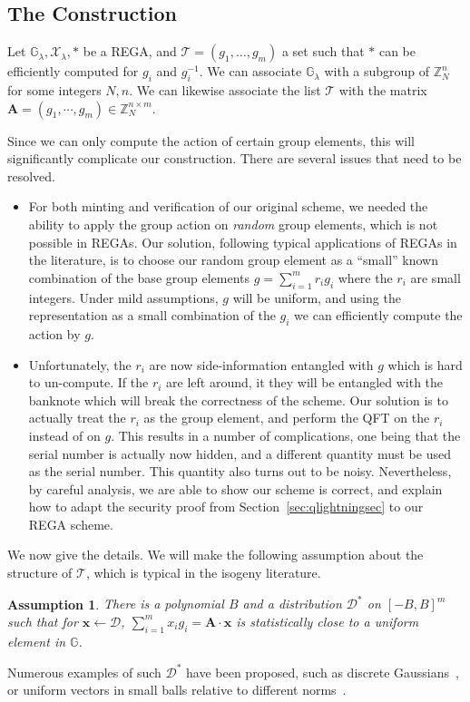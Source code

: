 \documentclass{article}\usepackage[a4paper,margin=20mm]{geometry}
\newtheorem{assumption}[theorem]{Assumption}
\numberwithin{theorem}{section}
\numberwithin{equation}{section}
\newcommand{\Z}{\mathbb{Z}}
\newcommand{\G}{\mathbb{G}}
\newcommand{\xv}{{\mathbf{x}}}
\newcommand{\Am}{{\mathbf{A}}}
\newcommand{\Ds}{{\mathcal{D}}}
\newcommand{\Ts}{{\mathcal{T}}}
\newcommand{\Xs}{{\mathcal{X}}}
\begin{document}
\subsection{The Construction}

Let $\G_\lambda,\Xs_\lambda,*$ be a REGA, and $\Ts=(g_1,\dots,g_m)$ a set such that $*$ can be efficiently computed for $g_i$ and $g_i^{-1}$. We can associate $\G_\lambda$ with a subgroup of $\Z_N^n$ for some integers $N,n$. We can likewise associate the list $\Ts$ with the matrix $\Am=(g_1,\cdots,g_m)\in\Z_N^{n\times m}$.

Since we can only compute the action of certain group elements, this will significantly complicate our construction. There are several issues that need to be resolved.
\begin{itemize}
	\item For both minting and verification of our original scheme, we needed the ability to apply the group action on \emph{random} group elements, which is not possible in REGAs. Our solution, following typical applications of REGAs in the literature, is to choose our random group element as a ``small'' known combination of the base group elements $g=\sum_{i=1}^m r_i g_i$ where the $r_i$ are small integers. Under mild assumptions, $g$ will be uniform, and using the representation as a small combination of the $g_i$ we can efficiently compute the action by $g$.
	\item Unfortunately, the $r_i$ are now side-information entangled with $g$ which is hard to un-compute. If the $r_i$ are left around, it they will be entangled with the banknote which will break the correctness of the scheme. Our solution is to actually treat the $r_i$ as the group element, and perform the QFT on the $r_i$ instead of on $g$. This results in a number of complications, one being that the serial number is actually now hidden, and a different quantity must be used as the serial number. This quantity also turns out to be noisy. Nevertheless, by careful analysis, we are able to show our scheme is correct, and explain how to adapt the security proof from Section~\ref{sec:qlightningsec} to our REGA scheme.
\end{itemize}

We now give the details. We will make the following assumption about the structure of $\Ts$, which is typical in the isogeny literature.

\begin{assumption}\label{assump:uniform} There is a polynomial $B$ and a distribution $\Ds^*$ on $[-B,B]^m$ such that for $\xv\gets\Ds$, $\sum_{i=1}^m x_i g_i=\Am\cdot\xv$ is statistically close to a uniform element in $\G$. \end{assumption}
Numerous examples of such $\Ds^*$ have been proposed, such as discrete Gaussians~\cite{EC:DeFGal19}, or uniform vectors in small balls relative to different norms~\cite{AC:CLMPR18,EPRINT:NOTT20}.
\end{document}

